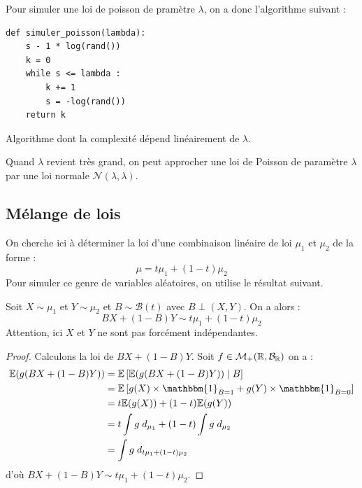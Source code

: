 \begin{proposition}
    Pour simuler une loi de poisson de pramètre $ \lambda$, on a donc l'algorithme suivant : 
    \begin{lstlisting}
def simuler_poisson(lambda):
    s - 1 * log(rand())
    k = 0 
    while s <= lambda : 
        k += 1
        s = -log(rand())
    return k 
    \end{lstlisting}
    Algorithme dont la complexité dépend linéairement de $ \lambda$. 
\end{proposition}

\begin{remark}
    Quand $ \lambda$ revient très grand, on peut approcher une loi de Poisson  de paramètre $ \lambda$ par 
    une loi normale $ \mathcal{N}( \lambda, \lambda)$.  
\end{remark}


\subsection{Mélange de lois}

On cherche ici à déterminer la loi d'une combinaison linéaire de loi $ \mu_1$ et $ \mu_2$ de la forme : 
    $$ \mu = t \mu_1 + (1-t) \mu_2 $$ 
Pour simuler ce genre de variables aléatoires, on utilise le résultat suivant. 

\begin{lemma}
    Soit $X \sim \mu_1$ et $ Y \sim \mu_2$ et $ B \sim \mathcal{B}(t)$ avec $ B \perp (X,Y)$. 
    On a alors : 
        $$ \boxed{BX + (1-B)Y \sim t \mu_1 + (1 - t) \mu_2} $$ 
    Attention, ici $X$ et $Y$ ne sont pas forcément indépendantes. 
\end{lemma}

\begin{proof}
    Calculons la loi de $ BX + (1-B)Y$. Soit $f \in \mathcal{M}_+(\mathbb{R}, \mathcal{B}_{\mathbb{R}} )$ on a : 
    \begin{align*}
        \mathbb{E}(g(BX + (1-B)Y)) &= \mathbb{E}\left[ \mathbb{E}(g(BX + (1 - B)Y)) \mid B \right] \\
        &= \mathbb{E} \left[ g(X) \times \mathbbm{1}_{B = 1} + g(Y) \times \mathbbm{1}_{B = 0} \right] \\
        &= t \mathbb{E}(g(X)) + (1-t) \mathbb{E}(g(Y)) \\ 
        &= t \int g \; d_{ \mu_1} + (1-t) \int g \; d_{ \mu_2} \\ 
        &= \int g \; d_{t \mu_1 + (1-t) \mu_2}  
    \end{align*}
    d'où $ BX + (1-B)Y \sim t \mu_1 + (1 - t) \mu_2$.
\end{proof}

